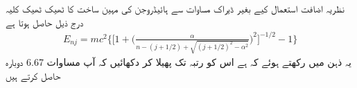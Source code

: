 نظریہ اضافت استعمال کیے بغیر ڈیراک مساوات سے ہائیڈروجن کی مہین ساخت کا ٹھیک ٹھیک کلیہ درج ذیل حاصل ہوتا ہے 
\begin{align*}
E_{nj} = mc^2 \big \{ \big [ 1 + \big ( \frac{\alpha}{n - (j + 1/2 ) + \sqrt{(j +1/2)^2 - \alpha^2}} \big )^2 \big ]^{- 1/2} -1 \big \}
\end{align*}
یہ ذہن میں رکھتے ہوئے کہ  ہے اس کو  رتبہ تک پھیلا کر دکھائیں کہ آپ مساوات 6.67 دوبارہ حاصل کرتے ہیں 

